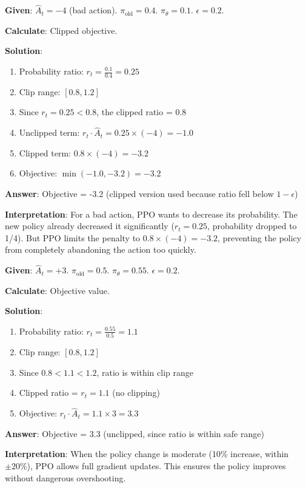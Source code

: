 \documentclass[11pt,a4paper]{article}
\begin{document}
\begin{tcolorbox}[colback=green!5!white,colframe=green!75!black,title=\textbf{Worked Example 44: PPO with Negative Advantage}]
\textbf{Given}: $\hat{A}_t = -4$ (bad action). $\pi_{\text{old}} = 0.4$. $\pi_\theta = 0.1$. $\epsilon = 0.2$.

\textbf{Calculate}: Clipped objective.

\textbf{Solution}:
\begin{enumerate}
    \item Probability ratio: $r_t = \frac{0.1}{0.4} = 0.25$
    \item Clip range: $[0.8, 1.2]$
    \item Since $r_t = 0.25 < 0.8$, the clipped ratio = $0.8$
    \item Unclipped term: $r_t \cdot \hat{A}_t = 0.25 \times (-4) = -1.0$
    \item Clipped term: $0.8 \times (-4) = -3.2$
    \item Objective: $\min(-1.0, -3.2) = -3.2$
\end{enumerate}

\textbf{Answer}: Objective = -3.2 (clipped version used because ratio fell below $1-\epsilon$)

\textbf{Interpretation}: For a bad action, PPO wants to decrease its probability. The new policy already decreased it significantly ($r_t = 0.25$, probability dropped to 1/4). But PPO limits the penalty to $0.8 \times (-4) = -3.2$, preventing the policy from completely abandoning the action too quickly.
\end{tcolorbox}

\begin{tcolorbox}[colback=green!5!white,colframe=green!75!black,title=\textbf{Worked Example 45: PPO Ratio Within Clip Range}]
\textbf{Given}: $\hat{A}_t = +3$. $\pi_{\text{old}} = 0.5$. $\pi_\theta = 0.55$. $\epsilon = 0.2$.

\textbf{Calculate}: Objective value.

\textbf{Solution}:
\begin{enumerate}
    \item Probability ratio: $r_t = \frac{0.55}{0.5} = 1.1$
    \item Clip range: $[0.8, 1.2]$
    \item Since $0.8 < 1.1 < 1.2$, ratio is within clip range
    \item Clipped ratio = $r_t = 1.1$ (no clipping)
    \item Objective: $r_t \cdot \hat{A}_t = 1.1 \times 3 = 3.3$
\end{enumerate}

\textbf{Answer}: Objective = 3.3 (unclipped, since ratio is within safe range)

\textbf{Interpretation}: When the policy change is moderate (10\% increase, within $\pm 20\%$), PPO allows full gradient updates. This ensures the policy improves without dangerous overshooting.
\end{tcolorbox}
\end{document}
